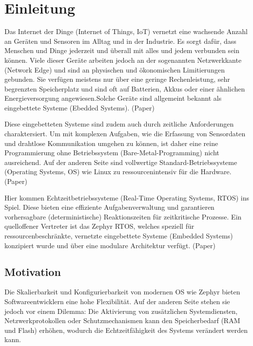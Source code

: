 
\chapter{Einleitung}
\label{ch:einleitung}

Das Internet der Dinge (Internet of Things, IoT) vernetzt eine wachsende Anzahl an Geräten und Sensoren im Alltag und in der Industrie. Es sorgt dafür, dass Menschen und Dinge jederzeit und überall mit alles und jedem verbunden sein können. Viele dieser Geräte arbeiten jedoch an der sogenannten Netzwerkkante (Network Edge) und sind an physischen und ökonomischen Limitierungen gebunden. Sie verfügen meistens nur über eine geringe Rechenleistung, sehr begrenzten Speicherplatz und sind oft auf Batterien, Akkus oder einer ähnlichen Energieversorgung angewiesen.Solche Geräte sind allgemeint bekannt als eingebettete Systeme (Ebedded Systems). (Paper)

Diese eingebetteten Systeme sind zudem auch durch zeitliche Anforderungen charaktersiert. Um mit komplexen Aufgaben, wie die Erfassung von Sensordaten und drahtlose Kommunikation umgehen zu können, ist daher eine reine Programmierung ohne Betriebssystem (Bare-Metal-Programming) nicht ausreichend. Auf der anderen Seite sind vollwertige Standard-Betriebssysteme (Operating Systems, OS) wie Linux zu ressourcenintensiv für die Hardware. (Paper)

Hier kommen Echtzeitbetriebssysteme (Real-Time Operating Systems, RTOS) ins Spiel. Diese bieten eine effiziente Aufgabenverwaltung und garantieren vorhersagbare (deterministische) Reaktionszeiten für zeitkritische Prozesse. Ein quelloffener Vertreter ist das Zephyr RTOS, welches speziell für ressourcenbeschränkte, vernetzte eingebettete Systeme (Embedded Systems) konzipiert wurde und über eine modulare Architektur verfügt. (Paper)

\section{Motivation}

Die Skalierbarkeit und Konfigurierbarkeit von modernen OS wie Zephyr bieten Softwareentwicklern eine hohe Flexibilität. Auf der anderen Seite stehen sie jedoch vor einem Dilemma: Die Aktivierung von zusätzlichen Systemdiensten, Netzwerkprotokollen oder Schutzmechanismen kann den Speicherbedarf (RAM und Flash) erhöhen, wodurch die Echtzeitfähigkeit des Systems verändert werden kann.

